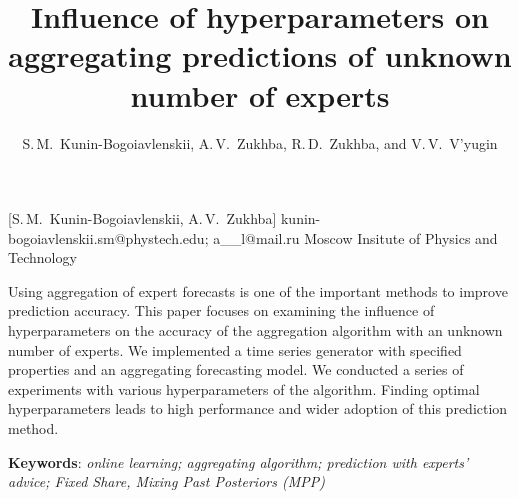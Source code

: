 \documentclass[12pt, twoside]{article}
\begin{document}
\English

\title
	[My first scientific paper] %
    {Influence of hyperparameters on aggregating predictions of unknown number of experts} %
\author
	[S.\,M.~Kunin-Bogoiavlenskii] %
	{S.\,M.~Kunin-Bogoiavlenskii, A.\,V.~Zukhba, R.\,D.~Zukhba, and V.\,V.~V’yugin} %
    [S.\,M.~Kunin-Bogoiavlenskii, A.\,V.~Zukhba] %
\email
    {kunin-bogoiavlenskii.sm@phystech.edu; a\_\_l@mail.ru}
\organization
    {Moscow Insitute of Physics and Technology}
\abstract
    {
    
	Using aggregation of expert forecasts is one of the important methods to improve prediction accuracy. 
	This paper focuses on examining the influence of hyperparameters on the accuracy of the aggregation algorithm with an unknown number of experts.
	We implemented a time series generator with specified properties and an aggregating forecasting model. 
	We conducted a series of experiments with various hyperparameters of the algorithm.
	Finding optimal hyperparameters leads to high performance and wider adoption of this prediction method.
	    	
%	
%	
%	
%				
	\noindent
    	\textbf{Keywords}: \emph{online learning; aggregating algorithm; prediction with experts’ advice; Fixed Share, Mixing Past Posteriors (MPP)}}

\end{document}
